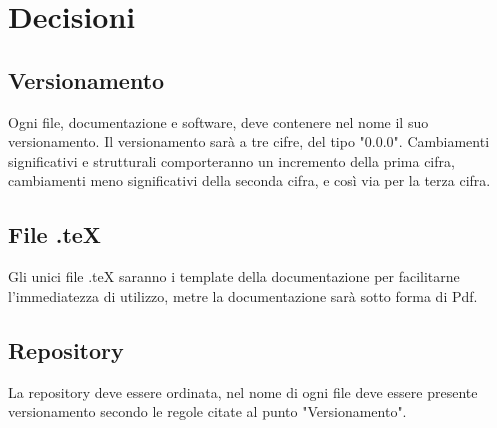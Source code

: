 \documentclass{article}
\begin{document}
\section{Decisioni}
\label{sec:decisioni}
\subsection{Versionamento}
Ogni file, documentazione e software, deve contenere nel nome il suo versionamento. Il versionamento sarà a tre cifre, del tipo "0.0.0". Cambiamenti significativi e strutturali comporteranno un incremento della prima cifra, cambiamenti meno significativi della seconda cifra, e così via per la terza cifra.
\subsection{File .teX}
Gli unici file .teX saranno i template della documentazione per facilitarne l'immediatezza di utilizzo, metre la documentazione sarà sotto forma di Pdf.
\subsection{Repository}
La repository deve essere ordinata, nel nome di ogni file deve essere presente versionamento secondo le regole citate al punto "Versionamento".
\end{document}
